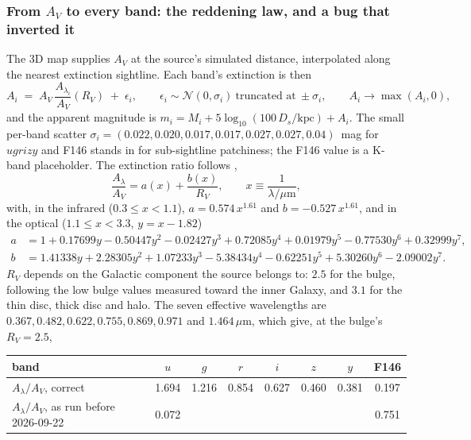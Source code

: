 \documentclass[english,10pt,a4paper]{article}
\begin{document}
	\subsubsection{From $A_V$ to every band: the reddening law, and a bug that inverted it}
	\label{subsec:reddening}

	The 3D map supplies $A_V$ at the source's simulated distance, interpolated along the nearest extinction sightline. Each band's extinction is then
	\begin{equation}
		A_i \;=\; A_V\,\frac{A_{\lambda_i}}{A_V}(R_V) \;+\; \epsilon_i, \qquad \epsilon_i \sim \mathcal{N}(0,\sigma_i)\ \text{truncated at}\ \pm\sigma_i, \qquad A_i \to \max(A_i, 0),
	\end{equation}
	and the apparent magnitude is $m_i = M_i + 5\log_{10}(100\,D_s/\mathrm{kpc}) + A_i$. The small per-band scatter $\sigma_i = (0.022, 0.020, 0.017, 0.017, 0.027, 0.027, 0.04)$~mag for $ugrizy$ and F146 stands in for sub-sightline patchiness; the F146 value is a K-band placeholder. The extinction ratio follows \cite{Cardelli1989},
	\begin{equation}
		\frac{A_\lambda}{A_V} = a(x) + \frac{b(x)}{R_V}, \qquad x \equiv \frac{1}{\lambda/\mu\mathrm{m}},
	\end{equation}
	with, in the infrared ($0.3 \le x < 1.1$), $a = 0.574\,x^{1.61}$ and $b = -0.527\,x^{1.61}$, and in the optical ($1.1 \le x < 3.3$, $y = x - 1.82$)
	\begin{align*}
		a &= 1 + 0.17699y - 0.50447y^2 - 0.02427y^3 + 0.72085y^4 + 0.01979y^5 - 0.77530y^6 + 0.32999y^7,\\
		b &= 1.41338y + 2.28305y^2 + 1.07233y^3 - 5.38434y^4 - 0.62251y^5 + 5.30260y^6 - 2.09002y^7 .
	\end{align*}
	$R_V$ depends on the Galactic component the source belongs to: $2.5$ for the bulge, following the low bulge values measured toward the inner Galaxy, and $3.1$ for the thin disc, thick disc and halo. The seven effective wavelengths are $0.367, 0.482, 0.622, 0.755, 0.869, 0.971$ and $1.464\,\mu$m, which give, at the bulge's $R_V=2.5$,

	\begin{center}
	\begin{tabular}{lccccccc}
		\toprule
		band & $u$ & $g$ & $r$ & $i$ & $z$ & $y$ & F146 \\
		\midrule
		$A_\lambda/A_V$, correct & 1.694 & 1.216 & 0.854 & 0.627 & 0.460 & 0.381 & 0.197 \\
		$A_\lambda/A_V$, as run before 2026-09-22 & 0.072 & & & & & & 0.751 \\
		\bottomrule
	\end{tabular}
	\end{center}
\end{document}
